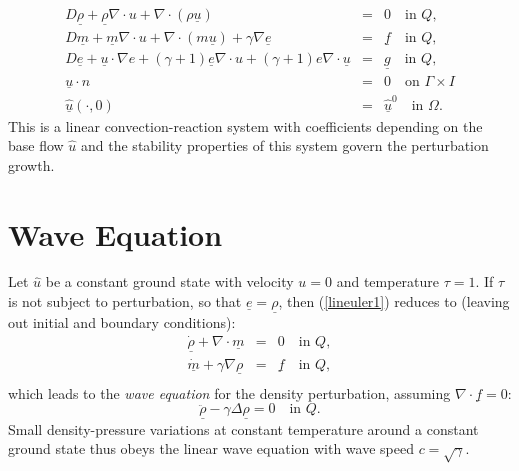 \begin{equation}\label{lineuler2}
\begin{array}{rcl}
D\underline{\rho} +\underline{\rho}\nabla\cdot u 
+\nabla\cdot (\rho\underline{u})&=&  0 \quad \mbox{in } Q, \\
D\underline{m} + \underline{m}\nabla\cdot u +
\nabla\cdot (m\underline{u})
+ \gamma\nabla\underline{e}&=&  \underline{f} \quad \mbox{in } Q, \\
D\underline{e} 
+\underline{u}\cdot\nabla e+(\gamma +1)\underline{e}\nabla\cdot u
+(\gamma +1) e\nabla\cdot\underline{u} &=& \underline{g}  \quad \mbox{in } Q,\\ 
\underline{u}\cdot n&=&0\quad \mbox{on } \Gamma\times I\\
\underline{\hat u}(\cdot ,0)&=&\underline{\hat u}^0\quad \mbox{in } \Omega .
\end{array} 
\end{equation}
This is a linear convection-reaction system with coefficients 
depending on the base flow $\hat u$ and the stability properties of 
this system govern the perturbation growth.


\section{Wave Equation}
Let $\hat u$ be a constant ground state
with velocity $u=0$ and temperature $\tau =1$. If  
$\tau$ is not subject to perturbation, so that $\underline{e} =
\underline{\rho}$, then (\ref{lineuler1}) reduces
to (leaving out initial and boundary conditions):
\begin{equation}\label{wave1}
\begin{array}{rcl}
\underline{\dot\rho} +\nabla\cdot\underline{m}
&=& 0\quad \mbox{in } Q, \\
\underline{\dot m}
+ \gamma\nabla\underline{\rho}&=&  \underline{f} \quad \mbox{in } Q, \\
\end{array} 
\end{equation}
which leads to the \emph{wave equation} for the density perturbation, assuming 
$\nabla\cdot\underline{f}=0$:
\begin{equation}\label{wave2}
\underline{\ddot\rho}-\gamma\Delta\underline{\rho}=0 \quad \mbox{in } Q.
\end{equation}
Small density-pressure variations at constant
temperature around a constant ground state thus
obeys the linear wave equation with wave speed $c=\sqrt{\gamma}$.

